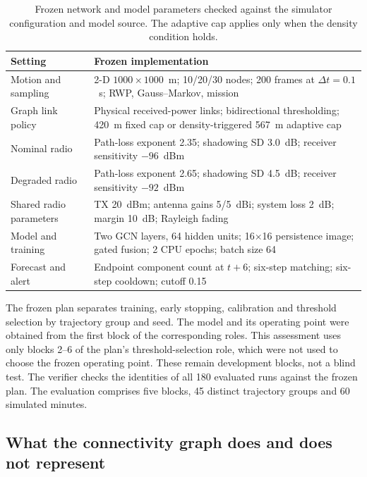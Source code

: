 \documentclass[10pt,a4paper]{article}
\begin{document}
\begin{table}[htbp]
\caption{Frozen network and model parameters checked against the simulator configuration and model source. The adaptive cap applies only when the density condition holds.}\label{tab:protocol}
\centering
\small
\setlength{\tabcolsep}{4pt}
\begin{tabular}{p{.31\linewidth}p{.61\linewidth}}
\toprule
Setting & Frozen implementation \\
\midrule
Motion and sampling & 2-D $1000\times1000$~m; 10/20/30 nodes; 200 frames at $\Delta t=0.1$~s; RWP, Gauss--Markov, mission \\
Graph link policy & Physical received-power links; bidirectional thresholding; 420~m fixed cap or density-triggered 567~m adaptive cap \\
Nominal radio & Path-loss exponent 2.35; shadowing SD 3.0~dB; receiver sensitivity $-96$~dBm \\
Degraded radio & Path-loss exponent 2.65; shadowing SD 4.5~dB; receiver sensitivity $-92$~dBm \\
Shared radio parameters & TX 20~dBm; antenna gains 5/5~dBi; system loss 2~dB; margin 10~dB; Rayleigh fading \\
Model and training & Two GCN layers, 64 hidden units; 16$\times$16 persistence image; gated fusion; 2 CPU epochs; batch size 64 \\
Forecast and alert & Endpoint component count at $t+6$; six-step matching; six-step cooldown; cutoff 0.15 \\
\bottomrule
\end{tabular}
\end{table}

The frozen plan separates training, early stopping, calibration and threshold selection by trajectory group and seed. The model and its operating point were obtained from the first block of the corresponding roles. This assessment uses only blocks 2--6 of the plan's threshold-selection role, which were not used to choose the frozen operating point. These remain development blocks, not a blind test. The verifier checks the identities of all 180 evaluated runs against the frozen plan. The evaluation comprises five blocks, 45 distinct trajectory groups and 60 simulated minutes.

\subsection{What the connectivity graph does and does not represent}
\end{document}
